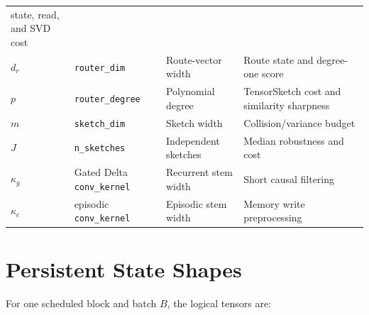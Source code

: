\begin{longtable}{@{}p{}p{}
  p{}p{}@{}}
state, read, and SVD cost \\
\(d_r\) & \texttt{router\_dim} & Route-vector width & Route state and
degree-one score \\
\(p\) & \texttt{router\_degree} & Polynomial degree & TensorSketch cost and
similarity sharpness \\
\(m\) & \texttt{sketch\_dim} & Sketch width & Collision/variance budget \\
\(J\) & \texttt{n\_sketches} & Independent sketches & Median robustness and
cost \\
\(\kappa_g\) & Gated Delta \texttt{conv\_kernel} & Recurrent stem width &
Short causal filtering \\
\(\kappa_e\) & episodic \texttt{conv\_kernel} & Episodic stem width & Memory
write preprocessing \\
\bottomrule
\end{longtable}

\section{Persistent State Shapes}
\label{app:state-shapes}

For one scheduled block and batch \(B\), the logical tensors are:

